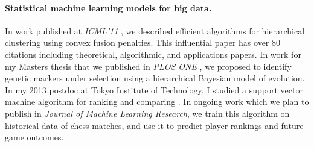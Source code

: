 \documentclass{article}
\begin{document}




\paragraph{Statistical machine learning models for big data.} In work
published at \emph{ICML'11} \citep{HOCKING-clusterpath}, we described
efficient algorithms for hierarchical clustering using convex fusion
penalties. This influential paper has over 80 citations including
theoretical, algorithmic, and applications papers. In work for my
Masters thesis that we published in \emph{PLOS ONE}
\citep{HOCKING-evolution}, we proposed to identify genetic markers
under selection using a hierarchical Bayesian model of evolution. In
my 2013 postdoc at Tokyo Institute of Technology, I studied a support
vector machine algorithm for ranking and comparing
\citep{svmcompare}. In ongoing work which we plan to publish in
\emph{Journal of Machine Learning Research}, we train this algorithm
on historical data of chess matches, and use it to predict player
rankings and future game outcomes.
\end{document}

